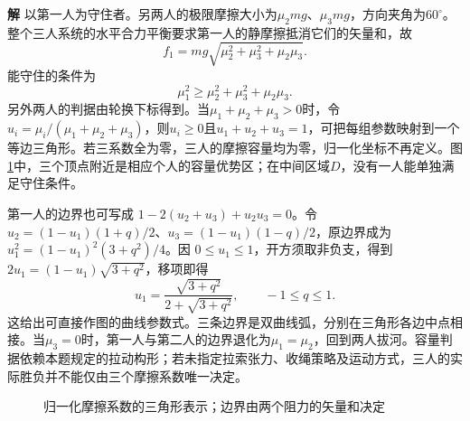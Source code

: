 \documentclass[11pt,openany,fontset=fandol]{ctexbook}
\theoremstyle{definition}\newtheorem{example}{例}[chapter]\newtheorem{exercise}{习题}[chapter]
\newcommand{\SolutionStart}{\par\medskip\ifdim\pagetotal>0pt\ifdim\dimexpr\pagegoal-\pagetotal\relax<3\baselineskip\newpage\fi\fi\noindent\textbf{解}\quad\ignorespaces}
\newenvironment{solution}{\SolutionStart}{\par\medskip}
\begin{document}
\begin{solution}
以第一人为守住者。另两人的极限摩擦大小为$\mu_2mg$、$\mu_3mg$，方向夹角为$60^\circ$。整个三人系统的水平合力平衡要求第一人的静摩擦抵消它们的矢量和，故
\[
 f_1=mg\sqrt{\mu_2^2+\mu_3^2+\mu_2\mu_3}.
\]
能守住的条件为
\[
 \boxed{\mu_1^2\ge\mu_2^2+\mu_3^2+\mu_2\mu_3}.
\]
另外两人的判据由轮换下标得到。当$\mu_1+\mu_2+\mu_3>0$时，令$u_i=\mu_i/(\mu_1+\mu_2+\mu_3)$，则$u_i\ge0$且$u_1+u_2+u_3=1$，可把每组参数映射到一个等边三角形。若三系数全为零，三人的摩擦容量均为零，归一化坐标不再定义。图\ref{mp4:fig:hw:l4-27-s}中，三个顶点附近是相应个人的容量优势区；在中间区域$D$，没有一人能单独满足守住条件。

第一人的边界也可写成 $1-2(u_2+u_3)+u_2u_3=0$。令 $u_2=(1-u_1)(1+q)/2$、$u_3=(1-u_1)(1-q)/2$，原边界成为 $u_1^2=(1-u_1)^2(3+q^2)/4$。因 $0\le u_1\le1$，开方须取非负支，得到 $2u_1=(1-u_1)\sqrt{3+q^2}$，移项即得
\[
 u_1=\frac{\sqrt{3+q^2}}{2+\sqrt{3+q^2}},\qquad -1\le q\le1.
\]
这给出可直接作图的曲线参数式。三条边界是双曲线弧，分别在三角形各边中点相接。当$\mu_3=0$时，第一人与第二人的边界退化为$\mu_1=\mu_2$，回到两人拔河。容量判据依赖本题规定的拉动构形；若未指定拉索张力、收绳策略及运动方式，三人的实际胜负并不能仅由三个摩擦系数唯一决定。


\begin{figure}[H]\centering
{}
\caption{归一化摩擦系数的三角形表示；边界由两个阻力的矢量和决定}\label{mp4:fig:hw:l4-27-s}
\end{figure}

\end{solution}
\end{document}
